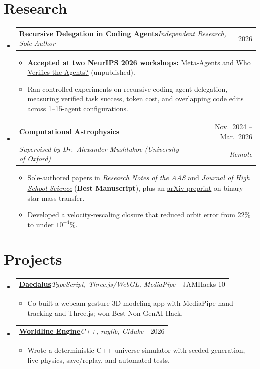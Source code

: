 \documentclass[letterpaper,11pt]{article}
\makeatletter
\newlength{\entrygap}\setlength{\entrygap}{6.5pt}        %
\newlength{\bulletgap}\setlength{\bulletgap}{2.5pt}        %
\newenvironment{entries}
  {\begin{itemize}[leftmargin=0.12in, label={}, itemsep=\entrygap, topsep=0pt, parsep=0pt, partopsep=0pt]}
  {\end{itemize}}
\newenvironment{bullets}
  {\begin{itemize}[leftmargin=0.16in, itemsep=1.25pt, topsep=\bulletgap, parsep=0pt, partopsep=0pt, label={\raisebox{0.15ex}{\scriptsize$\bullet$}}]\small}
  {\end{itemize}}
\newcommand{\entry}[4]{%
  \item
  \begin{tabular*}{\linewidth}[t]{l@{\extracolsep{\fill}}r}
    \textbf{#1} & #2 \\[-1pt]
    \textit{\small #3} & \textit{\small #4}
  \end{tabular*}}
\newcommand{\role}[3]{%
  \item
  \begin{tabular*}{\linewidth}[t]{l@{\extracolsep{\fill}}r}
    \textbf{#1}\hspace{0.55em}\textit{\small #2} & #3
  \end{tabular*}}
\newcommand{\project}[3]{%
  \item
  \begin{tabular*}{\linewidth}[t]{l@{\extracolsep{\fill}}r}
    #1\hspace{0.4em}{\small$|$}\hspace{0.4em}\textit{\small #2} & #3
  \end{tabular*}}
\newcommand{\link}[2]{\href{#1}{\underline{#2}}}
\makeatother
\begin{document}
\section{Research}
\begin{entries}
  \role{\link{https://yuzeli.ca/research/verifying-the-second-agent}{Recursive Delegation in Coding Agents}}{Independent Research, Sole Author}{2026}
  \begin{bullets}
    \item \textbf{Accepted at two NeurIPS 2026 workshops:} \link{https://openreview.net/forum?id=SdOyXkODbB}{Meta-Agents} and \link{https://openreview.net/forum?id=NUTxvM1q3H}{Who Verifies the Agents?} (unpublished).
    \item Ran controlled experiments on recursive coding-agent delegation, measuring verified task success, token cost, and overlapping code edits across 1--15-agent configurations.
  \end{bullets}

  \entry{Computational Astrophysics}{Nov.\ 2024 -- Mar.\ 2026}
        {Supervised by Dr.\ Alexander Mushtukov (University of Oxford)}{Remote}
  \begin{bullets}
    \item Sole-authored papers in \link{https://doi.org/10.3847/2515-5172/ae4513}{\textit{Research Notes of the AAS}} and \link{https://doi.org/10.64336/001c.159153}{\textit{Journal of High School Science}} (\textbf{Best Manuscript}), plus an \link{https://arxiv.org/abs/2608.19107}{arXiv preprint} on binary-star mass transfer.
    \item Developed a velocity-rescaling closure that reduced orbit error from 22\% to under $10^{-4}$\%.
  \end{bullets}
\end{entries}

\section{Projects}
\begin{entries}
  \project{\link{https://devpost.com/software/glebber-stometric}{\textbf{Daedalus}}}{TypeScript, Three.js/WebGL, MediaPipe}{JAMHacks 10}
  \begin{bullets}
    \item Co-built a webcam-gesture 3D modeling app with MediaPipe hand tracking and Three.js; won Best Non-GenAI Hack.
  \end{bullets}

  \project{\link{https://github.com/fireheartjerry/worldline-engine}{\textbf{Worldline Engine}}}{C++, raylib, CMake}{2026}
  \begin{bullets}
    \item Wrote a deterministic C++ universe simulator with seeded generation, live physics, save/replay, and automated tests.
  \end{bullets}
\end{entries}
\end{document}
